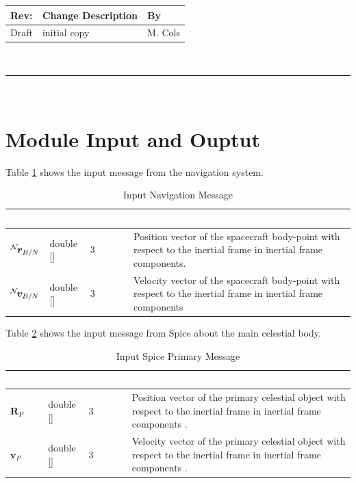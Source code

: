 \documentclass[]{AVSSimReportMemo}
\begin{document}
\makeCover


%
%
\pagestyle{empty}
{\renewcommand{\arraystretch}{2}
\noindent
\begin{longtable}{|p{0.5in}|p{4.5in}|p{1.14in}|}
\hline
{\bfseries Rev}: & {\bfseries Change Description} & {\bfseries By} \\
\hline
Draft & initial copy & M. Cols \\
\hline

\end{longtable}
}

\newpage
\setcounter{page}{1}
\pagestyle{fancy}

\tableofcontents
~\\ \hrule ~\\

\newpage
\section{Module Input and Ouptut}
Table \ref{tab:inputNavTable} shows the input message from the navigation system.
\begin{table}[h!]
	\centering
	\caption{Input Navigation Message}
	\begin{tabular}{|l|l|l|p{3in}|}
		\hline
		\rowcolor{BrickRed}
		\textcolor{white}{Name} & \textcolor{white}{Type} & 
		\textcolor{white}{Length} & 
		\textcolor{white}{Description}  \\ \hline
		$\leftexp{N}{\bm{r}}_{B/N}$ & double [] & 3 & 
		Position vector of the spacecraft body-point with respect to the inertial frame in inertial frame components. \\ \hline
		$\leftexp{N}{\bm{v}}_{B/N}$ & double [] & 3 & 
		Velocity vector of the spacecraft body-point with respect to the inertial frame in inertial frame components \\ \hline
	\end{tabular}
	\label{tab:inputNavTable}
\end{table}


Table \ref{tab:inputCelTable} shows the input message from Spice about the main celestial body.
\begin{table}[h!]
	\centering
	\caption{Input Spice Primary Message}
	\begin{tabular}{|l|l|l|p{3in}|}
		\hline
		\rowcolor{BrickRed}
		\textcolor{white}{Name} & \textcolor{white}{Type} & 
		\textcolor{white}{Length} & 
		\textcolor{white}{Description}  \\ \hline
		$\bm{R}_P$  & double [] & 3 & 
		Position vector of the primary celestial object with respect to the inertial frame in inertial frame components . \\ \hline
		$\bm{v}_P$  & double [] & 3 & 
		Velocity vector of the primary celestial object with respect to the inertial frame in inertial frame components . \\ \hline
	\end{tabular}
	\label{tab:inputCelTable}
\end{table}
\end{document}
